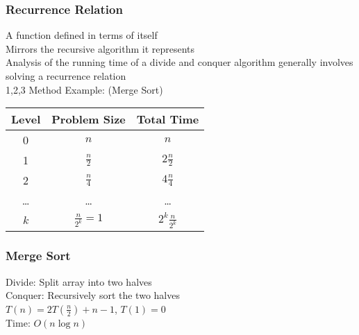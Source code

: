 \documentclass{article}
\begin{document}
\begin{multicols*}{2}
        \subsubsection*{Recurrence Relation}
        A function defined in terms of itself\\
        Mirrors the recursive algorithm it represents\\
        Analysis of the running time of a divide and conquer algorithm generally involves
        solving a recurrence relation\\
        1,2,3 Method Example: (Merge Sort)\\
        \begin{tabular}{c|c|c}
            Level & Problem Size & Total Time \\
            \hline
            0 & $n$ & $n$ \\
            1 & $\frac{n}{2}$ & $2\frac{n}{2}$ \\
            2 & $\frac{n}{4}$ & $4\frac{n}{4}$ \\
            \ldots & \ldots & \ldots \\
            $k$ & $\frac{n}{2^k} = 1$ & $2^{k}\frac{n}{2^k}$ \\
        \end{tabular}
        \subsubsection*{Merge Sort}
        Divide: Split array into two halves\\
        Conquer: Recursively sort the two halves\\
        $T(n) = 2T(\frac{n}{2}) + n - 1$, $T(1) = 0$\\
        Time: $O(n\log n)$
    \end{multicols*}
\end{document}
